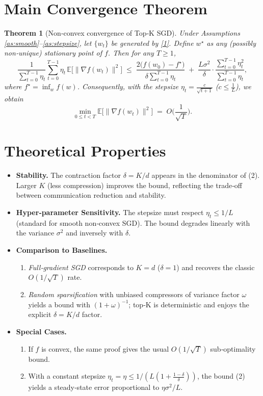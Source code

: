 \documentclass{article}
\newtheorem{theorem}{Theorem}
\begin{document}
\section*{Main Convergence Theorem}
\begin{theorem}[Non‑convex convergence of Top‑K SGD]\label{thm:main}
Under Assumptions \ref{as:smooth}–\ref{as:stepsize}, let $\{w_t\}$ be generated by \eqref{1}.  
Define $w^\star$ as any (possibly non‑unique) stationary point of $f$.
Then for any $T\ge1$,
\[
\frac{1}{\sum_{t=0}^{T-1}\eta_t}\sum_{t=0}^{T-1}\eta_t\,
\mathbb{E}\big[\|\nabla f(w_t)\|^2\big]
\;\le\;
\frac{2\big(f(w_0)-f^\star\big)}{\delta\sum_{t=0}^{T-1}\eta_t}
\;+\;
\frac{L\sigma^2}{\delta}\cdot\frac{\sum_{t=0}^{T-1}\eta_t^{2}}{\sum_{t=0}^{T-1}\eta_t},
\tag{2}
\]
where $f^\star=\inf_{w}f(w)$.
Consequently, with the stepsize $\eta_t=\frac{c}{\sqrt{t+1}}$ ($c\le\frac{1}{L}$), we obtain
\[
\min_{0\le t<T}\mathbb{E}\big[\|\nabla f(w_t)\|^2\big]
\;=\;O\!\Big(\frac{1}{\sqrt{T}}\Big).
\tag{3}
\]
\end{theorem}

\section*{Theoretical Properties}
\begin{itemize}[leftmargin=*]
\item \textbf{Stability.} The contraction factor $\delta=K/d$ appears in the denominator of (2). Larger $K$ (less compression) improves the bound, reflecting the trade‑off between communication reduction and stability.
\item \textbf{Hyper‑parameter Sensitivity.} The stepsize must respect $\eta_t\le 1/L$ (standard for smooth non‑convex SGD). The bound degrades linearly with the variance $\sigma^2$ and inversely with $\delta$.
\item \textbf{Comparison to Baselines.}
    \begin{enumerate}
        \item \emph{Full‑gradient SGD} corresponds to $K=d$ ($\delta=1$) and recovers the classic $O(1/\sqrt{T})$ rate.
        \item \emph{Random sparsification} with unbiased compressors of variance factor $\omega$ yields a bound with $(1+\omega)^{-1}$; top‑K is deterministic and enjoys the explicit $\delta=K/d$ factor.
    \end{enumerate}
\item \textbf{Special Cases.}
    \begin{enumerate}
        \item If $f$ is convex, the same proof gives the usual $O(1/\sqrt{T})$ sub‑optimality bound.
        \item With a constant stepsize $\eta_t=\eta\le 1/(L(1+\frac{1-\delta}{\delta}))$, the bound (2) yields a steady‑state error proportional to $\eta\sigma^2/L$.
    \end{enumerate}
\end{itemize}
\end{document}
